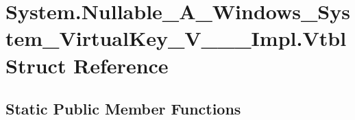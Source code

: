 \hypertarget{struct_system_1_1_nullable___a___windows___system___virtual_key___v_______impl_1_1_vtbl}{}\section{System.\+Nullable\+\_\+\+A\+\_\+\+Windows\+\_\+\+System\+\_\+\+Virtual\+Key\+\_\+\+V\+\_\+\+\_\+\+\_\+\+Impl.\+Vtbl Struct Reference}
\label{struct_system_1_1_nullable___a___windows___system___virtual_key___v_______impl_1_1_vtbl}
\subsection*{Static Public Member Functions}

